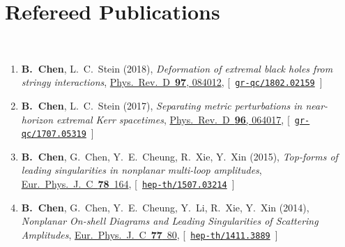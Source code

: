 \newcommand{\grqc}[1]{\href{http://arxiv.org/abs/#1}{\texttt{gr-qc/#1}}}
\newcommand{\hepth}[1]{\href{http://arxiv.org/abs/#1}{\texttt{hep-th/#1}}}


\newcommand{\baoyi}[1]{\textbf{B.~Chen},}


\section*{\sc Refereed Publications}~
\vspace{-.2in}

\begin{enumerate}

      \item
    \baoyi,
    L.~C.~Stein
    (2018),
    {\it Deformation of extremal black holes from stringy interactions},
    \href{http://dx.doi.org/10.1103/PhysRevD.97.084012}{Phys.~Rev.~D~{\bf 97}, 084012},
    [~\grqc{1802.02159}~]
  
    \item
    \baoyi,
    L.~C.~Stein
    (2017),
    {\it Separating metric perturbations in near-horizon extremal Kerr spacetimes},
    \href{http://dx.doi.org/10.1103/PhysRevD.96.064017}{Phys.~Rev.~D~{\bf 96}, 064017},
    [~\grqc{1707.05319}~]

     \item 
    \baoyi,
    G.~Chen,
    Y.~E.~Cheung,           
    R.~Xie,
    Y.~Xin
    (2015),
    {\it Top-forms of leading singularities in nonplanar multi-loop amplitudes},
   \href{http://dx.doi.org/10.1140/epjc/s10052-018-5629-z}{Eur.~Phys.~J.~C~{\bf78}~164},
    [~\hepth{1507.03214}~]

    \item 
    \baoyi,
    G.~Chen,
    Y.~E.~Cheung,  
    Y.~Li,         
    R.~Xie,
    Y.~Xin
    (2014),
    {\it Nonplanar On-shell Diagrams and Leading Singularities of Scattering Amplitudes},
    \href{http://dx.doi.org/10.1140/epjc/s10052-017-4659-2}{Eur.~Phys.~J.~C~{\bf77}~80},
    [~\hepth{1411.3889}~]
\end{enumerate}

